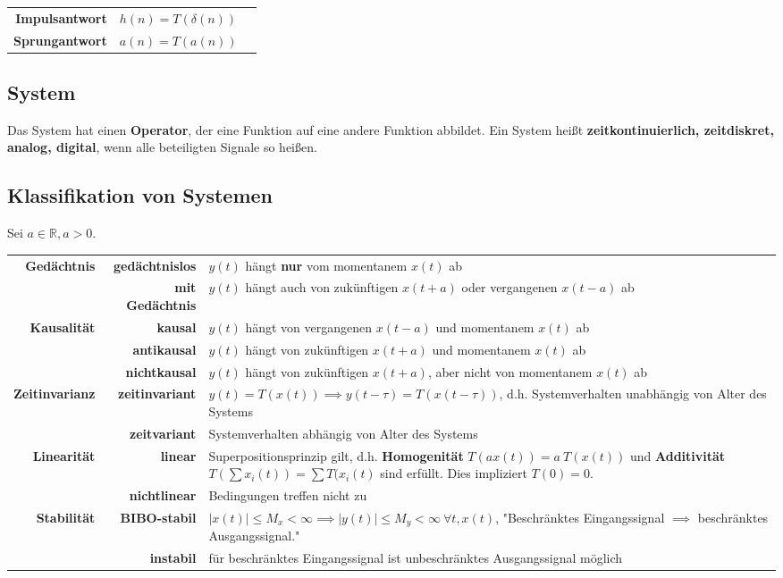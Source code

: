 \documentclass[10pt,a4paper]{article}
\begin{document}
\begin{longtable}{r >{\centering\arraybackslash} p{7cm} l}
	\textbf{Impulsantwort} & $h(n) = T(\delta(n))$ \\
	\textbf{Sprungantwort} & $a(n) = T(a(n))$ \\
\end{longtable} 

\subsection*{System}
Das System hat einen \textbf{Operator}, der eine Funktion auf eine andere Funktion abbildet. Ein System heißt \textbf{zeitkontinuierlich, zeitdiskret, analog, digital}, wenn alle beteiligten Signale so heißen.

\newpage
\subsection*{Klassifikation von Systemen}
Sei $a \in \mathbb R, a > 0$.
\vspace{.5em}

\begin{centering}
\begin{tabular}{r | r | p{11.5cm}}
	\textbf{Gedächtnis} &
	\textbf{gedächtnislos} & $y(t)$ hängt \textbf{nur} vom momentanem $x(t)$ ab \\
	& \textbf{mit Gedächtnis} & $y(t)$ hängt auch von zukünftigen $x(t + a)$ oder vergangenen $x(t - a)$ ab \\

	\textbf{Kausalität} &
	\textbf{kausal} & $y(t)$ hängt von vergangenen $x(t - a)$ und momentanem $x(t)$ ab \\
	& \textbf{antikausal} & $y(t)$ hängt von zukünftigen $x(t + a)$ und momentanem $x(t)$ ab \\
	& \textbf{nichtkausal} & $y(t)$ hängt von zukünftigen $x(t + a)$, aber nicht von momentanem $x(t)$ ab \\

	\textbf{Zeitinvarianz} &
	\textbf{zeitinvariant} & $y(t) = T(x(t)) \implies y(t-\tau)=T(x(t-\tau))$, d.h.
	Systemverhalten unabhängig von Alter des Systems \\
	& \textbf{zeitvariant} & Systemverhalten abhängig von Alter des Systems\\

	\textbf{Linearität} &
	\textbf{linear} & Superpositionsprinzip gilt, d.h.
	\textbf{Homogenität} $T(ax(t)) = a ~ T(x(t))$ und
	\textbf{Additivität} $T \left(\sum x_i(t) \right) = \sum T(x_i(t)$ sind erfüllt. Dies impliziert $T(0) = 0$. \\
	& \textbf{nichtlinear} & Bedingungen treffen nicht zu \\

	\textbf{Stabilität} &
	\textbf{BIBO-stabil} & $\vert x(t)\vert\leq M_x <\infty \implies \vert y(t)\vert\leq M_y < \infty ~ \forall t, x(t)$, "Beschränktes Eingangssignal $\implies$ beschränktes Ausgangssignal." \\
	& \textbf{instabil} & für beschränktes Eingangssignal ist unbeschränktes Ausgangssignal möglich
\end{tabular}
\end{centering}
\end{document}
